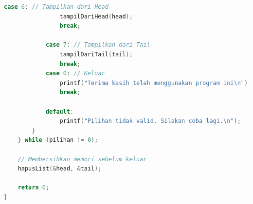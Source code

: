 \documentclass{article}
\begin{document}
\begin{lstlisting}[language=C, caption={Program Double Linked List},
  label={lst:sample-c-code}, basicstyle=\ttfamily\footnotesize,
  keywordstyle=\color{blue}, commentstyle=\color{green},
  stringstyle=\color{red}]
            case 6: // Tampilkan dari Head
                tampilDariHead(head);
                break;
                
            case 7: // Tampilkan dari Tail
                tampilDariTail(tail);
                break;
            case 0: // Keluar
                printf("Terima kasih telah menggunakan program ini\n");
                break;
                
            default:
                printf("Pilihan tidak valid. Silakan coba lagi.\n");
        }
    } while (pilihan != 0);
    
    // Membersihkan memori sebelum keluar
    hapusList(&head, &tail);
    
    return 0;
}

\end{lstlisting}
\end{document}
